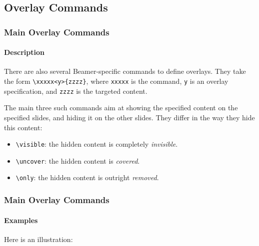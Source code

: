 \documentclass[10pt,    %
    english,            %
    xcolor=table,       %
    envcountsect,       %
    aspectratio=43      %
]{beamer}
\begin{document}
\subsection{Overlay Commands}
\begin{frame}
    \frametitle{Main Overlay Commands}
    \framesubtitle{Description}

    There are also several Beamer-specific commands to define overlays. They take the form \texttt{\textbackslash{}xxxxx<y>\{zzzz\}}, where \texttt{xxxxx} is the command, \texttt{y} is an overlay specification, and \texttt{zzzz} is the targeted content.
    
    \medskip
    The main three such commands aim at showing the specified content on the specified slides, and hiding it on the other slides. They differ in the way they hide this content:
    \begin{itemize}
        \item \texttt{\textbackslash{}visible}: the hidden content is completely \textit{invisible}.
        \item \texttt{\textbackslash{}uncover}: the hidden content is \textit{covered}.
        \item \texttt{\textbackslash{}only}: the hidden content is outright \textit{removed}. 
    \end{itemize}
\end{frame}
    
\begin{frame}[t]
    \frametitle{Main Overlay Commands}
    \framesubtitle{Examples}

    Here is an illustration: 
    
    
    
    
    
    
\end{frame}
    
\end{document}
